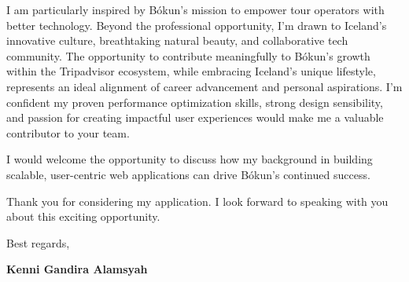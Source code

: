 \documentclass[11pt]{article}
\begin{document}
I am particularly inspired by Bókun's mission to empower tour operators with better technology. Beyond the professional opportunity, I'm drawn to Iceland's innovative culture, breathtaking natural beauty, and collaborative tech community. The opportunity to contribute meaningfully to Bókun's growth within the Tripadvisor ecosystem, while embracing Iceland's unique lifestyle, represents an ideal alignment of career advancement and personal aspirations. I'm confident my proven performance optimization skills, strong design sensibility, and passion for creating impactful user experiences would make me a valuable contributor to your team.

I would welcome the opportunity to discuss how my background in building scalable, user-centric web applications can drive Bókun's continued success.

Thank you for considering my application. I look forward to speaking with you about this exciting opportunity.

\vspace{1em}

Best regards,

\textbf{Kenni Gandira Alamsyah}
\end{document}
